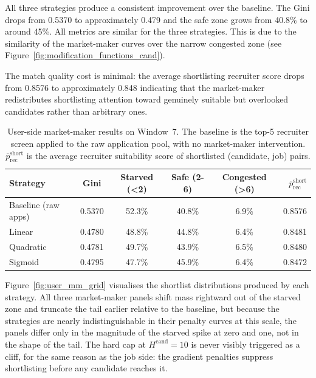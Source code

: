 All three strategies produce a consistent improvement over the baseline.
The Gini drops from 0.5370 to approximately 0.479 and the safe zone grows
from 40.8\% to around 45\%. All metrics are similar for the three strategies. This is due to the similarity of the market-maker curves over the narrow congested zone (see Figure~\ref{fig:modification_functions_cand}). 

The match quality cost is minimal: the average
shortlisting recruiter score drops from 0.8576 to approximately 0.848 indicating that the market-maker redistributes
shortlisting attention toward genuinely suitable but overlooked candidates
rather than arbitrary ones.

\begin{table}[H]
    \centering
    \caption{User-side market-maker results on Window~7. The baseline is
    the top-5 recruiter screen applied to the raw application pool, with
    no market-maker intervention. $\bar{p}_{\text{rec}}^{\text{short}}$ is the average recruiter suitability score of shortlisted (candidate, job)
    pairs.}
    \label{tab:user_mm_results}
    \begin{tabular}{@{}lccccr@{}}
        \toprule
        \textbf{Strategy} & \textbf{Gini} & \textbf{Starved (<2)} &
        \textbf{Safe (2-6)} & \textbf{Congested (>6)} & $\bar{p}_{\text{rec}}^{\text{short}}$ \\
        \midrule
        Baseline (raw apps)   & 0.5370 & 52.3\% & 40.8\% & 6.9\% & 0.8576 \\
        \midrule
        Linear                & 0.4780 & 48.8\% & 44.8\% & 6.4\% & 0.8481 \\
        Quadratic             & 0.4781 & 49.7\% & 43.9\% & 6.5\% & 0.8480 \\
        Sigmoid               & 0.4795 & 47.7\% & 45.9\% & 6.4\% & 0.8472 \\
        \bottomrule
    \end{tabular}
\end{table}

Figure~\ref{fig:user_mm_grid} visualises the shortlist distributions
produced by each strategy. All three market-maker panels shift mass
rightward out of the starved zone and truncate the tail earlier relative
to the baseline, but because the strategies are nearly indistinguishable
in their penalty curves at this scale, the panels differ only in the
magnitude of the starved spike at zero and one, not in the shape of the
tail. The hard cap at $H^{\text{cand}} = 10$ is never visibly triggered
as a cliff, for the same reason as the job side: the gradient penalties
suppress shortlisting before any candidate reaches it. 

